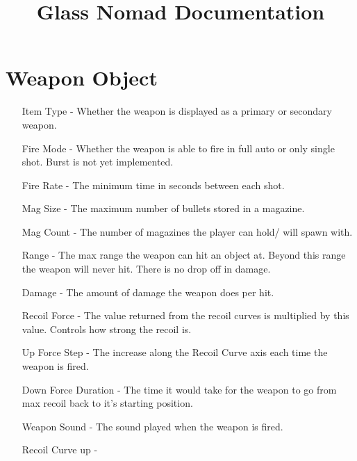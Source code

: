 \documentclass{article}
\begin{document}
    \title{Glass Nomad Documentation}


    \begin{titlepage}
        \maketitle
    \end{titlepage}

    \tableofcontents

    \newpage

    \section{Weapon Object}
    \begin{itemize}
        \item[Item Type - ] Whether the weapon is displayed as a primary or secondary weapon.
        \item[Fire Mode - ] Whether the weapon is able to fire in full auto or only single shot. Burst is not yet implemented.
        \item[Fire Rate - ] The minimum time in seconds between each shot.
        \item[Mag Size - ] The maximum number of bullets stored in a magazine.
        \item[Mag Count - ] The number of magazines the player can hold/ will spawn with.    
        \item[Range - ] The max range the weapon can hit an object at. Beyond this range the weapon will never hit. There is no drop off in damage.
        \item[Damage - ] The amount of damage the weapon does per hit.
        \item[Recoil Force - ] The value returned from the recoil curves is multiplied by this value. Controls how strong the recoil is.
        \item[Up Force Step - ] The increase along the Recoil Curve axis each time the weapon is fired.
        \item[Down Force Duration - ] The time it would take for the weapon to go from max recoil back to it's starting position.
        \item[Weapon Sound - ] The sound played when the weapon is fired.
        \item[Recoil Curve up - ]    
    \end{itemize}
\end{document}
